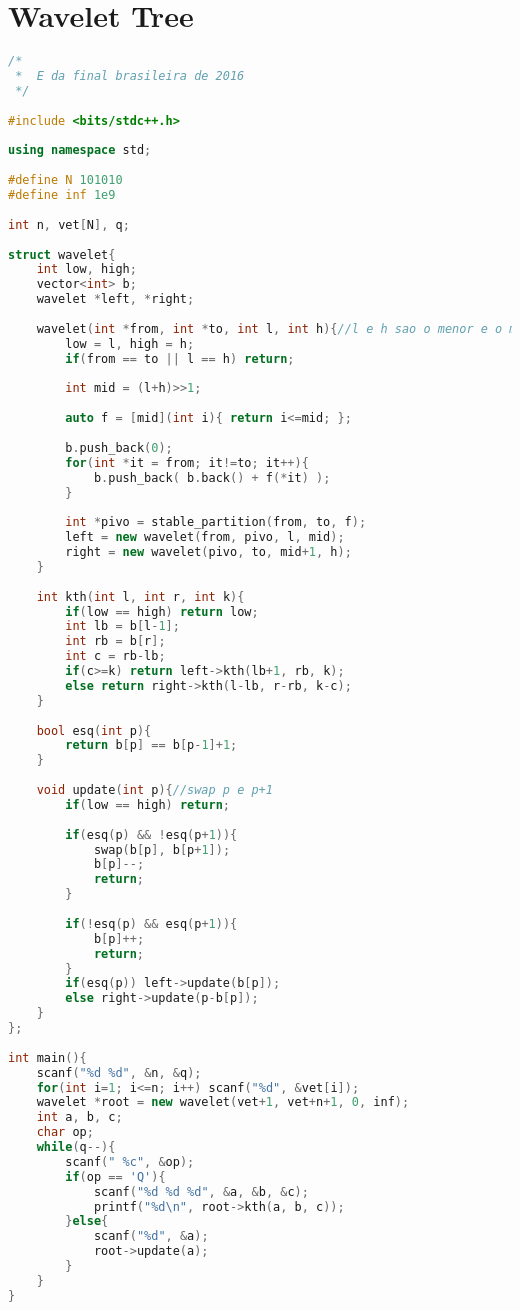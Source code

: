 \documentclass[12pt,a4paper,twoside]{report}
\begin{document}
\section{Wavelet Tree}
\noindent\begin{lstlisting}[caption=Wavelet Tree,language=C++]
/*
 *  E da final brasileira de 2016
 */
 
#include <bits/stdc++.h>
 
using namespace std;
 
#define N 101010
#define inf 1e9
 
int n, vet[N], q;
 
struct wavelet{
    int low, high;
    vector<int> b;
    wavelet *left, *right;
     
    wavelet(int *from, int *to, int l, int h){//l e h sao o menor e o maior elemento do alfabeto
        low = l, high = h;
        if(from == to || l == h) return;
         
        int mid = (l+h)>>1;
         
        auto f = [mid](int i){ return i<=mid; };
         
        b.push_back(0);
        for(int *it = from; it!=to; it++){
            b.push_back( b.back() + f(*it) );
        }
         
        int *pivo = stable_partition(from, to, f);
        left = new wavelet(from, pivo, l, mid);
        right = new wavelet(pivo, to, mid+1, h);
    }
     
    int kth(int l, int r, int k){
        if(low == high) return low;
        int lb = b[l-1];
        int rb = b[r];
        int c = rb-lb;
        if(c>=k) return left->kth(lb+1, rb, k);
        else return right->kth(l-lb, r-rb, k-c);
    }
     
    bool esq(int p){
        return b[p] == b[p-1]+1;
    }
     
    void update(int p){//swap p e p+1
        if(low == high) return;
         
        if(esq(p) && !esq(p+1)){
            swap(b[p], b[p+1]);
            b[p]--;
            return;
        }
         
        if(!esq(p) && esq(p+1)){
            b[p]++;
            return;
        }
        if(esq(p)) left->update(b[p]);
        else right->update(p-b[p]);
    }
};
 
int main(){
    scanf("%d %d", &n, &q);
    for(int i=1; i<=n; i++) scanf("%d", &vet[i]);
    wavelet *root = new wavelet(vet+1, vet+n+1, 0, inf);
    int a, b, c;
    char op;
    while(q--){
        scanf(" %c", &op);
        if(op == 'Q'){
            scanf("%d %d %d", &a, &b, &c);
            printf("%d\n", root->kth(a, b, c));
        }else{
            scanf("%d", &a);
            root->update(a);
        }
    }
}
\end{lstlisting}
\end{document}
